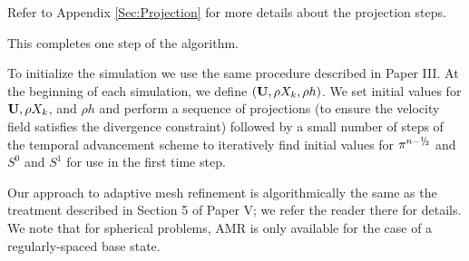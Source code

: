 \begin{description}
Refer to Appendix \ref{Sec:Projection} for more details about the projection steps.

\end{description}
This completes one step of the algorithm.

To initialize the simulation we use the same procedure described in Paper III.
At the beginning of each simulation, we define $({\bf{U}},\rho X_k,\rho h)$.
We set initial values for ${\bf{U}}, \rho X_k$, and $\rho h$ and perform a sequence of projections 
(to ensure the velocity field satisfies the divergence constraint) 
followed by a small number of steps of the temporal advancement scheme to iteratively 
find initial values for $\pi^{n-\myhalf}$ and $S^0$ and $S^1$ for use in the first time step.

Our approach to adaptive mesh refinement is algorithmically the same as the treatment described in Section 5 of Paper V; we refer the reader there for details.
We note that for spherical problems, AMR is only available for the case of a regularly-spaced base state.

